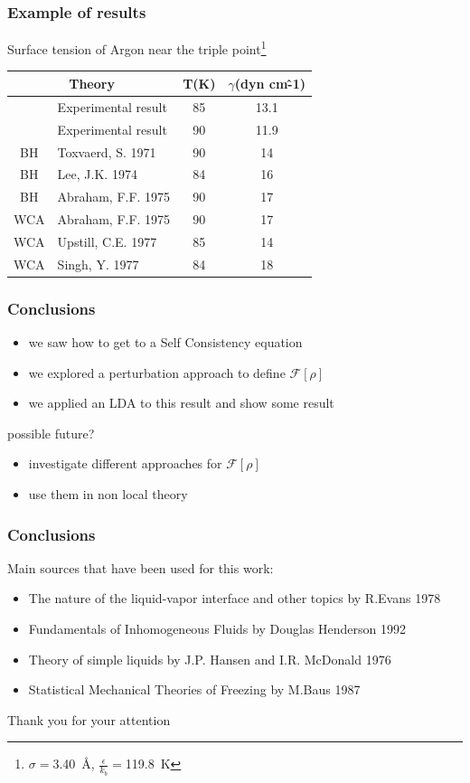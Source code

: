 \documentclass[12pt,notes=off,unicode]{beamer}
\begin{document}
  \begin{frame}[c]\frametitle{Example of results}
  Surface tension of Argon near the triple point\footnote{$\sigma=$\SI{3.40}{\angstrom}, $\frac{\epsilon}{k_b}=$\SI{119.8}{\kelvin}}
    \begin{table}[c]
      \centering
      \begin{tabular}{c|l|cc}
      \hline

      \hline
      \multicolumn{2}{c|}{Theory}  & T(K) & $\gamma$(dyn cm\^-1) \\
      \hline
        &Experimental result & 85 & 13.1 \\
        &Experimental result & 90 & 11.9 \\
        BH &Toxvaerd, S. 1971 & 90 & 14 \\
        BH &Lee, J.K. 1974 & 84 & 16 \\
        BH &Abraham, F.F. 1975 & 90 & 17 \\
        WCA &Abraham, F.F. 1975 & 90 & 17 \\
        WCA &Upstill, C.E. 1977 & 85 & 14 \\
        WCA &Singh, Y. 1977 & 84 & 18 \\
      \hline
      
      \hline
      \end{tabular}
    \end{table}
  \end{frame}

  \begin{frame}[c]\frametitle{Conclusions}
    \begin{itemize}
      \item we saw how to get to a Self Consistency equation
      \item we explored a perturbation approach to define $\mathcal{F}[\rho]$
      \item we applied an LDA to this result and show some result
    \end{itemize}
    \pause
    possible future?
    \begin{itemize}
      \item investigate different approaches for $\mathcal{F}[\rho]$
      \item use them in non local theory
    \end{itemize}
  
  \end{frame}
  \begin{frame}[c]\frametitle{Conclusions}
  Main sources that have been used for this work:
  \begin{itemize}
    \item The nature of the liquid-vapor interface and other topics by R.Evans 1978
    \item Fundamentals of Inhomogeneous Fluids by Douglas Henderson 1992
    \item Theory of simple liquids by J.P. Hansen and I.R. McDonald 1976  
    \item Statistical Mechanical Theories of Freezing by M.Baus 1987
  \end{itemize}
  \begin{center}
    Thank you for your attention
  \end{center}
  \end{frame}
\end{document}
